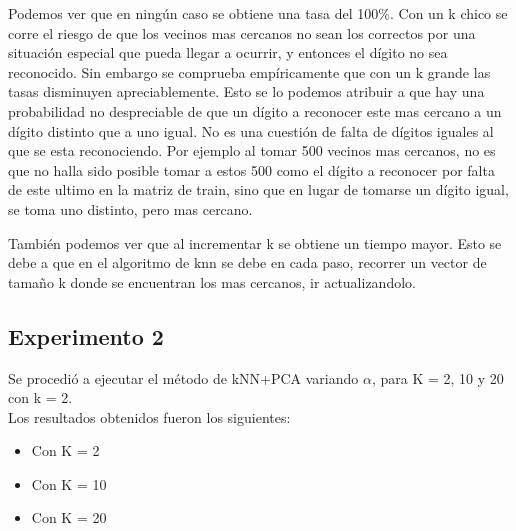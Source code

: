 Podemos ver que en ningún caso se obtiene una tasa del 100$ \% $. Con un k chico se corre el riesgo de que los vecinos mas cercanos no sean los correctos por una situación especial que pueda llegar a ocurrir, y entonces el dígito no sea reconocido. Sin embargo se comprueba empíricamente que con un k grande las tasas disminuyen apreciablemente. Esto se lo podemos atribuir a que hay una probabilidad no despreciable de que un dígito a reconocer este mas cercano a un dígito distinto que a uno igual. No es una cuestión de falta de dígitos iguales al que se esta reconociendo. Por ejemplo al tomar 500 vecinos mas cercanos, no es que no halla sido posible tomar a estos 500 como el dígito a reconocer por falta de este ultimo en la matriz de train, sino que en lugar de tomarse un dígito igual, se toma uno distinto, pero mas cercano.

También podemos ver que al incrementar k se obtiene un tiempo mayor. Esto se debe a que en el algoritmo de knn se debe en cada paso, recorrer un vector de tamaño k donde se encuentran los mas cercanos, ir actualizandolo. 


\subsection{Experimento 2}
Se procedió a ejecutar el método de kNN+PCA variando $\alpha$, para K = 2, 10 y 20 con k = 2.\\ 
Los resultados obtenidos fueron los siguientes:
\begin{itemize}
\item Con K = 2\\

    
\item Con K = 10\\

\item Con K = 20\\
\end{itemize}


